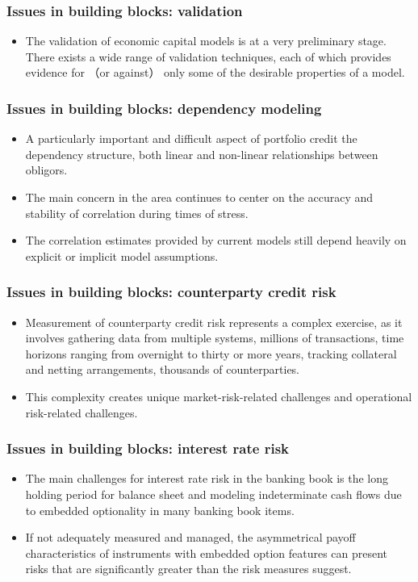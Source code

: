 \subsubsection{Issues in building blocks: validation}
\begin{itemize}
\item The validation of economic capital models is at a very preliminary stage. There exists a wide range of validation techniques, each of which provides evidence for （or against） only some of the desirable properties of a model.
\end{itemize}


\subsubsection{Issues in building blocks: dependency modeling}
\begin{itemize}
\item A particularly important and difficult aspect of portfolio credit the dependency structure, both linear and non-linear relationships between obligors.
\item The main concern in the area continues to center on the accuracy and stability of correlation during times of stress.
\item The correlation estimates provided by current models still depend heavily on explicit or implicit model assumptions.
\end{itemize}


\subsubsection{Issues in building blocks: counterparty credit risk}
\begin{itemize}
\item Measurement of counterparty credit risk represents a complex exercise, as it involves gathering data from multiple systems, millions of transactions, time horizons ranging from overnight to thirty or more years, tracking collateral and netting arrangements, thousands of counterparties.
\item This complexity creates unique market-risk-related challenges and operational risk-related challenges.
\end{itemize}


\subsubsection{Issues in building blocks: interest rate risk}
\begin{itemize}
\item The main challenges for interest rate risk in the banking book is the long holding period for balance sheet and modeling indeterminate cash flows due to embedded optionality in many banking book items.
\item If not adequately measured and managed, the asymmetrical payoff characteristics of instruments with embedded option features can present risks that are significantly greater than the risk measures suggest.
\end{itemize}


